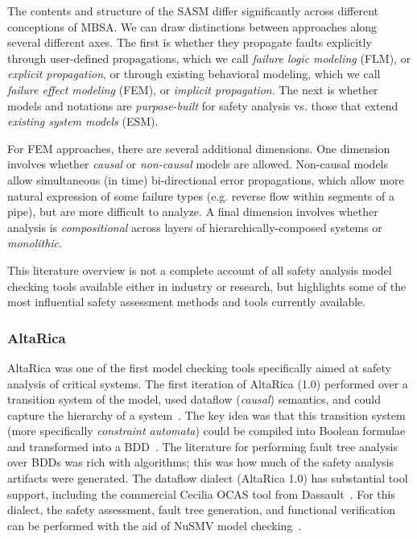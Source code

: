The contents and structure of the SASM differ significantly across different conceptions of MBSA.  We can draw distinctions between approaches along several different axes.  The first is whether they propagate faults explicitly through user-defined propagations, which we call {\em failure logic modeling} (FLM), or {\em explicit propagation}, or through existing behavioral modeling, which we call {\em failure effect modeling} (FEM), or {\em implicit propagation}.  The next is whether models and notations are {\em purpose-built} for safety analysis vs. those that extend {\em existing system models} (ESM).

For FEM approaches, there are several additional dimensions.  One dimension involves whether {\em causal} or {\em non-causal} models are allowed.  Non-causal models allow simultaneous (in time) bi-directional error propagations, which allow more natural expression of some failure types (e.g. reverse flow within segments of a pipe), but are more difficult to analyze.  A final dimension involves whether analysis is {\em compositional} across layers of hierarchically-composed systems or {\em monolithic}.  %

This literature overview is not a complete account of all safety analysis model checking tools available either in industry or research, but highlights some of the most influential safety assessment methods and tools currently available. 

\subsubsection{AltaRica}
AltaRica was one of the first model checking tools specifically aimed at safety analysis of critical systems. The first iteration of AltaRica (1.0) performed over a transition system of the model, used dataflow ({\em causal}) semantics, and could capture the hierarchy of a system~\cite{signoret1998altarica}. The key idea was that this transition system (more specifically {\em constraint automata}) could be compiled into Boolean formulae and transformed into a BDD~\cite{point1999altarica}. The literature for performing fault tree analysis over BDDs was rich with algorithms; this was how much of the safety analysis artifacts were generated. The dataflow dialect (AltaRica 1.0) has substantial tool support, including the commercial Cecilia OCAS tool from Dassault~\cite{bieber2004safety}. For this dialect, the safety assessment, fault tree generation, and functional verification can be performed with the aid of NuSMV model checking~\cite{symbAltaRica}.

